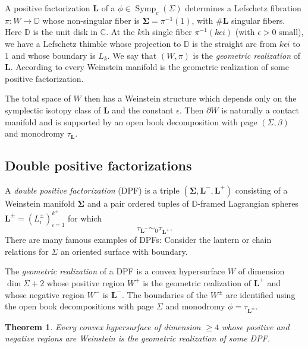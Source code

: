 \documentclass[11pt]{amsart}
\DeclareMathOperator{\Symp}{Symp}
\newcommand{\thicc}[1]{\pmb{#1}}
\newcommand{\C}{\mathbb{C}}
\newcommand{\disk}{\mathbb{D}}
\newcommand{\LagTuple}{\thicc{L}}
\newtheorem{thm}{Theorem}[section]
\begin{document}
A positive factorization $\LagTuple$ of a $\phi \in \Symp_{c}(\Sigma)$ determines a Lefschetz fibration $\pi: W \rightarrow \disk$ whose non-singular fiber is $\thicc{\Sigma} = \pi^{-1}(1)$, with $\# \LagTuple$ singular fibers. Here $\disk$ is the unit disk in $\C$. At the $k$th single fiber $\pi^{-1}(k\epsilon i)$ (with $\epsilon > 0$ small), we have a Lefschetz thimble whose projection to $\disk$ is the straight arc from $k\epsilon i$ to $1$ and whose boundary is $L_{k}$. We say that $(W, \pi)$ is the \emph{geometric realization} of $\LagTuple$. According to \cite{BHH:GirouxCorrespondence, GirouxPardon} every Weinstein manifold is the geometric realization of some positive factorization.

The total space of $W$ then has a Weinstein structure which depends only on the symplectic isotopy class of $\LagTuple$ and the constant $\epsilon$. Then $\partial W$ is naturally a contact manifold and is supported by an open book decomposition with page $(\Sigma, \beta)$ and monodromy $\tau_{\LagTuple}$.

\subsection{Double positive factorizations}

A \emph{double positive factorization} (DPF) is a triple $(\thicc{\Sigma}, \LagTuple^{-}, \LagTuple^{+})$ consisting of a Weinstein manifold $\thicc{\Sigma}$ and a pair ordered tuples of $\disk$-framed Lagrangian spheres $\LagTuple^{\pm} = (L^{\pm}_{i})_{i=1}^{k^{\pm}}$ for which
\begin{equation*}
\tau_{\LagTuple^{-}} \sim_{0} \tau_{\LagTuple^{+}}.
\end{equation*}
There are many famous examples of DPFs: Consider the lantern or chain relations for $\Sigma$ an oriented surface with boundary.

The \emph{geometric realization} of a DPF is a convex hypersurface $W$ of dimension $\dim \Sigma + 2$ whose positive region $W^{+}$ is the geometric realization of $\LagTuple^{+}$ and whose negative region $W^{-}$ is $\LagTuple^{-}$. The boundaries of the $W^{\pm}$ are identified using the open book decompositions with page $\Sigma$ and monodromy $\phi = \tau_{\LagTuple^{\pm}}$.

\begin{thm}
Every convex hypersurface of dimension $\geq 4$ whose positive and negative regions are Weinstein is the geometric realization of some DPF.
\end{thm}
\end{document}
